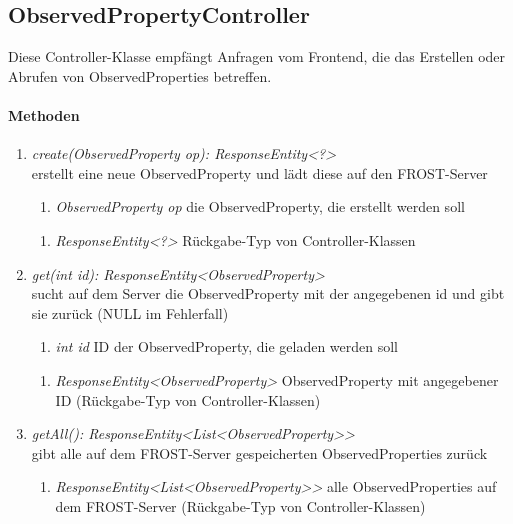 \subsection*{ObservedPropertyController}\label{ObsPCon}
Diese Controller-Klasse empfängt Anfragen vom Frontend, die das Erstellen oder Abrufen von ObservedProperties betreffen.

\paragraph{Methoden}

\begin{enumerate}[+]
	\item \textit{ create(ObservedProperty op): ResponseEntity<?> }\\
	erstellt eine neue ObservedProperty und lädt diese auf den FROST-Server
	
	\begin{enumerate}[$\bullet$]
		\item \textit{ObservedProperty op} die ObservedProperty, die erstellt werden soll
		
	\end{enumerate}
	\vspace{-0.2cm}
	\begin{enumerate}[$\circ$]
		\item \textit{ResponseEntity<?>} Rückgabe-Typ von Controller-Klassen
	\end{enumerate}
	
	\item \textit{ get(int id): ResponseEntity<ObservedProperty> }\\
	sucht auf dem Server die ObservedProperty mit der angegebenen id und gibt sie zurück (NULL im Fehlerfall)
	
	\begin{enumerate}[$\bullet$]
		\item \textit{int id} ID der ObservedProperty, die geladen werden soll
		
	\end{enumerate}
	\vspace{-0.2cm}
	\begin{enumerate}[$\circ$]
		\item \textit{ResponseEntity<ObservedProperty>} ObservedProperty mit angegebener ID (Rückgabe-Typ von Controller-Klassen)
	\end{enumerate}
	\item \textit{ getAll(): ResponseEntity<List<ObservedProperty>> }\\
	gibt alle auf dem FROST-Server gespeicherten ObservedProperties zurück
	
	\begin{enumerate}[$\circ$]
		\item \textit{ResponseEntity<List<ObservedProperty>>} alle ObservedProperties auf dem FROST-Server (Rückgabe-Typ von Controller-Klassen)
	\end{enumerate}
	
	
\end{enumerate}	